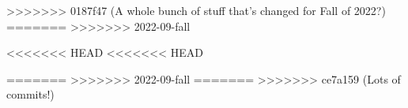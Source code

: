 \documentclass{../../oss-apphys-exam}
\newcounter{lastmc}
\begin{document}
\begin{multicols*}{2}
\begin{questions}
%      
%    
%    
>>>>>>> 0187f47 (A whole bunch of stuff that's changed for Fall of 2022?)
=======
>>>>>>> 2022-09-fall
  \end{questions}
  \setcounter{lastmc}{\value{question}}
\end{multicols*}
\newpage

<<<<<<< HEAD
<<<<<<< HEAD

\genfreedirections
=======
>>>>>>> 2022-09-fall
=======
>>>>>>> ce7a159 (Lots of commits!)
\end{document}
